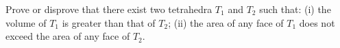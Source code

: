 Prove or disprove that there exist two tetrahedra $T_1$ and $T_2$ such that:
(i) the volume of $T_1$ is greater than that of $T_2$;
(ii) the area of any face of $T_1$ does not exceed the area of any face of $T_2$.